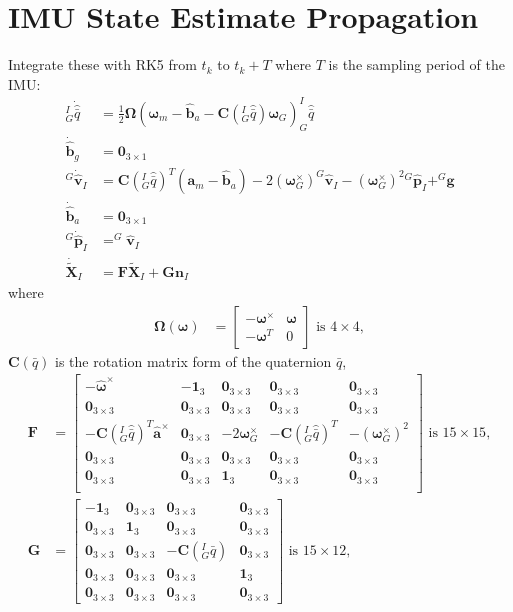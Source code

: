 \documentclass[10pt,letterpaper,fleqn,oneside]{article}
\newcommand{\nl}{\\[0.5em]}
\def\Vec#1{\mathbf{#1}} %
\newcommand{\bbm}{\begin{bmatrix}}
\newcommand{\ebm}{\end{bmatrix}}
\begin{document}
\section{IMU State Estimate Propagation}
Integrate these with RK5 from $t_k$ to $t_k + T$ where $T$ is the sampling period of the IMU:
\begin{align}
^I_G\dot{\hat{\bar{q}}} &= \frac{1}{2}\boldsymbol{\Omega}\left(\boldsymbol{\omega}_m - \hat{\Vec{b}}_a - \Vec{C}\left(^I_G\hat{\bar{q}}\right) \boldsymbol{\omega}_G \right)^I_G\hat{\bar{q}} \nl
\dot{\hat{\Vec{b}}}_g  &= \Vec{0}_{3\times1} \nl
^G\dot{\hat{\Vec{v}}}_I &= \Vec{C}\left(^I_G\hat{\bar{q}}\right)^T\left(\Vec{a}_m - \hat{\Vec{b}}_a\right) - 2\left(\boldsymbol{\omega}_G^\times\right)^G\hat{\Vec{v}}_I - \left(\boldsymbol{\omega}_G^\times\right)^2 \left.^G\hat{\Vec{p}}_I\right. + ^G\Vec{g} \nl
\dot{\hat{\Vec{b}}}_a &= \Vec{0}_{3\times1} \nl
^G\dot{\hat{\Vec{p}}}_I &= ^G\hat{\Vec{v}}_I \nl
\dot{\widetilde{\Vec{X}}}_I &= \Vec{F}\widetilde{\Vec{X}}_I + \Vec{G}\Vec{n}_I
\end{align}
where
\begin{align}
\boldsymbol{\Omega}\left(\boldsymbol{\omega}\right) &= \bbm -\boldsymbol{\omega}^\times & \boldsymbol{\omega} \nl
																										-\boldsymbol{\omega}^T & 0
																								\ebm 
																								\text{ is }4\times4,
\end{align}
$\Vec{C}(\bar{q})$ is the rotation matrix form of the quaternion $\bar{q}$,
\begin{align}
\Vec{F} &= \bbm	-\hat{\boldsymbol{\omega}}^\times & -\Vec{1}_3 & \Vec{0}_{3\times3} & \Vec{0}_{3\times3} & \Vec{0}_{3\times3} \nl
					\Vec{0}_{3\times3} & \Vec{0}_{3\times3} & \Vec{0}_{3\times3} & \Vec{0}_{3\times3} & \Vec{0}_{3\times3} \nl
					-\Vec{C}\left(^I_G\hat{\bar{q}}\right)^T\hat{\Vec{a}}^\times & \Vec{0}_{3\times3} & -2\boldsymbol{\omega}_G^\times & -\Vec{C}\left(^I_G\hat{\bar{q}}\right)^T & -\left(\boldsymbol{\omega}_G^\times\right)^2 \nl
					\Vec{0}_{3\times3} & \Vec{0}_{3\times3} & \Vec{0}_{3\times3} & \Vec{0}_{3\times3} & \Vec{0}_{3\times3} \nl
					\Vec{0}_{3\times3} & \Vec{0}_{3\times3} & \Vec{1}_3 & \Vec{0}_{3\times3} & \Vec{0}_{3\times3} \nl
		\ebm \text{ is } 15\times15, \nl
\Vec{G} &= 	\bbm	-\Vec{1}_3 & \Vec{0}_{3\times3} & \Vec{0}_{3\times3} & \Vec{0}_{3\times3} \nl
								\Vec{0}_{3\times3} & \Vec{1}_3 & \Vec{0}_{3\times3} & \Vec{0}_{3\times3} \nl
								\Vec{0}_{3\times3} & \Vec{0}_{3\times3} & -\Vec{C}\left(^I_G\hat{\bar{q}}\right) & \Vec{0}_{3\times3} \nl
								\Vec{0}_{3\times3} & \Vec{0}_{3\times3} & \Vec{0}_{3\times3} & \Vec{1}_3 \nl
								\Vec{0}_{3\times3} & \Vec{0}_{3\times3} & \Vec{0}_{3\times3} & \Vec{0}_{3\times3}
					\ebm \text{ is } 15\times12,
\end{align}
\end{document}
